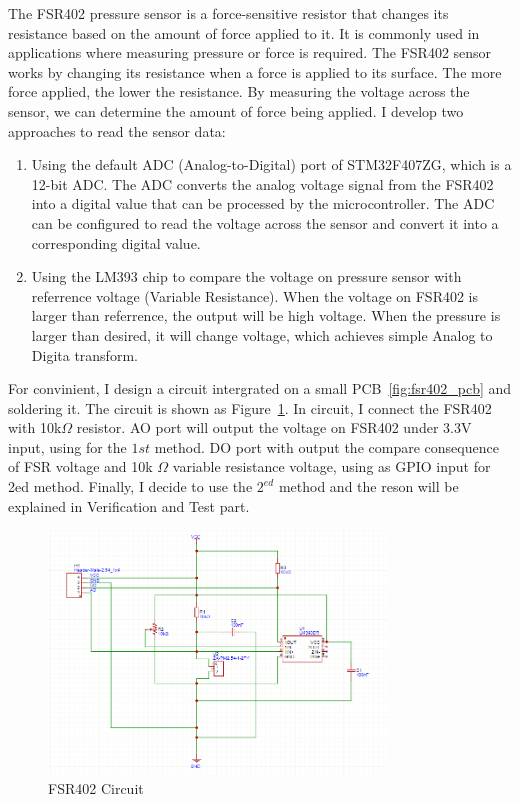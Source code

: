 The FSR402 pressure sensor is a force-sensitive resistor that changes its resistance based on the amount of force applied to it. It is commonly used in applications where measuring pressure or force is required. The FSR402 sensor works by changing its resistance when a force is applied to its surface. The more force applied, the lower the resistance. By measuring the voltage across the sensor, we can determine the amount of force being applied. I develop two approaches to read the sensor data: 
\begin{enumerate}
    \item Using the default ADC (Analog-to-Digital) port of STM32F407ZG, which is a 12-bit ADC. The ADC converts the analog voltage signal from the FSR402 into a digital value that can be processed by the microcontroller. The ADC can be configured to read the voltage across the sensor and convert it into a corresponding digital value. 
    \item Using the LM393 chip to compare the voltage on pressure sensor with referrence voltage (Variable Resistance). When the voltage on FSR402 is larger than referrence, the output will be high voltage. When the pressure is larger than desired, it will change voltage, which achieves simple Analog to Digita transform. 
\end{enumerate} 
For convinient, I design a circuit intergrated on a small PCB~\ref{fig:fsr402_pcb} and soldering it. The circuit is shown as Figure~\ref{fig:fsr402_circuit}. In circuit, I connect the FSR402 with 10k$\Omega$ resistor. AO port will output the voltage on FSR402 under 3.3V input, using for the $1{st}$ method. DO port with output the compare consequence of FSR voltage and 10k $\Omega$ variable resistance voltage, using as GPIO input for 2ed method. Finally, I decide to use the $2^{ed}$ method and the reson will be explained in Verification and Test part.
\begin{figure}[h]
    \centering
    \includegraphics[width=0.8\textwidth]{Figures/FSR402_CIR.png}
    \caption{FSR402 Circuit}
    \label{fig:fsr402_circuit}
\end{figure}
  
